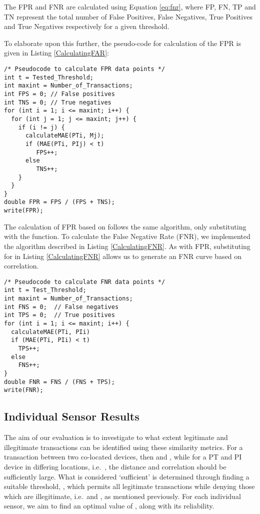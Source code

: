 \documentclass{article}
\begin{document}
The FPR and FNR are calculated using Equation \ref{eq:fnr}, where FP, FN, TP and TN represent the total number of False Positives, False Negatives, True Positives and True Negatives respectively for a given threshold.



 
To elaborate upon this further, the pseudo-code for calculation of the FPR is given in Listing \ref{CalculatingFAR}:

\begin{lstlisting}[style=customc, caption={Calculating False Positive Rate},label=CalculatingFAR]
/* Pseudocode to calculate FPR data points */
int t = Tested_Threshold;
int maxint = Number_of_Transactions;
int FPS = 0; // False positives
int TNS = 0; // True negatives
for (int i = 1; i <= maxint; i++) {
  for (int j = 1; j <= maxint; j++) {
    if (i != j) {
      calculateMAE(PTi, Mj);
      if (MAE(PTi, PIj) < t)
         FPS++;
      else
         TNS++;
    }        
  }
}
double FPR = FPS / (FPS + TNS);
write(FPR);
\end{lstlisting}

The calculation of FPR based on  follows the same algorithm, only substituting  with the  function.  To calculate the False Negative Rate (FNR), we implemented the algorithm described in Listing \ref{CalculatingFNR}.  As with FPR, substituting  for  in Listing \ref{CalculatingFNR} allows us to generate an FNR curve based on correlation. 

\begin{lstlisting}[style=customc, caption={Calculating False Negative Rate},label=CalculatingFNR]
/* Pseudocode to calculate FNR data points */
int t = Test_Threshold;
int maxint = Number_of_Transactions;
int FNS = 0;  // False negatives
int TPS = 0;  // True positives
for (int i = 1; i <= maxint; i++) {
  calculateMAE(PTi, PIi)
  if (MAE(PTi, PIi) < t)
    TPS++;
  else
    FNS++;
}
double FNR = FNS / (FNS + TPS);
write(FNR);
\end{lstlisting}

\subsection{Individual Sensor Results}
\label{sec:IndividualSensorResults}

The aim of our evaluation is to investigate to what extent legitimate and illegitimate transactions can be identified using these similarity metrics.  For a transaction between two co-located devices, then  and , while for a PT and PI device in differing locations, i.e.\ , the distance and correlation should be sufficiently large.  What is considered `sufficient' is determined through finding a suitable threshold, , which permits all legitimate transactions while denying those which are illegitimate, i.e.\  and , as mentioned previously.  For each individual sensor, we aim to find an optimal value of , along with its reliability.
\end{document}
